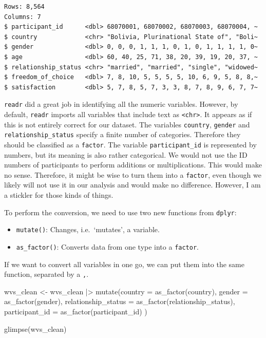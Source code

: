 \documentclass[
  letterpaper,
]{krantz}
\makeatletter
\newenvironment{Shaded}{\begin{snugshade}}{\end{snugshade}}
\newcommand{\AttributeTok}[1]{\textcolor[rgb]{0.40,0.45,0.13}{#1}}
\newcommand{\FunctionTok}[1]{\textcolor[rgb]{0.28,0.35,0.67}{#1}}
\newcommand{\NormalTok}[1]{\textcolor[rgb]{0.00,0.23,0.31}{#1}}
\newcommand{\OtherTok}[1]{\textcolor[rgb]{0.00,0.23,0.31}{#1}}
\newcommand{\SpecialCharTok}[1]{\textcolor[rgb]{0.37,0.37,0.37}{#1}}
\newenvironment{kframe}{%
\medskip{}
\setlength{\fboxsep}{.8em}
 \def\at@end@of@kframe{}%
 \ifinner\ifhmode%
  \def\at@end@of@kframe{\end{minipage}}%
  \begin{minipage}{\columnwidth}%
 \fi\fi%
 \def\FrameCommand##1{\hskip\@totalleftmargin \hskip-\fboxsep
 \colorbox{shadecolor}{##1}\hskip-\fboxsep
     \hskip-\linewidth \hskip-\@totalleftmargin \hskip\columnwidth}%
 \MakeFramed {\advance\hsize-\width
   \@totalleftmargin\z@ \linewidth\hsize
   \@setminipage}}%
 {\par\unskip\endMakeFramed%
 \at@end@of@kframe}
\renewenvironment{Shaded}{\begin{kframe}}{\end{kframe}}
\makeatother
\begin{document}
\begin{verbatim}
Rows: 8,564
Columns: 7
$ participant_id      <dbl> 68070001, 68070002, 68070003, 68070004, ~
$ country             <chr> "Bolivia, Plurinational State of", "Boli~
$ gender              <dbl> 0, 0, 0, 1, 1, 1, 0, 1, 0, 1, 1, 1, 1, 0~
$ age                 <dbl> 60, 40, 25, 71, 38, 20, 39, 19, 20, 37, ~
$ relationship_status <chr> "married", "married", "single", "widowed~
$ freedom_of_choice   <dbl> 7, 8, 10, 5, 5, 5, 5, 10, 6, 9, 5, 8, 8,~
$ satisfaction        <dbl> 5, 7, 8, 5, 7, 3, 3, 8, 7, 8, 9, 6, 7, 7~
\end{verbatim}

\texttt{readr} did a great job in identifying all the numeric variables.
However, by default, \texttt{readr} imports all variables that include
text as \texttt{\textless{}chr\textgreater{}}. It appears as if this is
not entirely correct for our dataset. The variables \texttt{country},
\texttt{gender} and \texttt{relationship\_status} specify a finite
number of categories. Therefore they should be classified as a
\texttt{factor}. The variable \texttt{participant\_id} is represented by
numbers, but its meaning is also rather categorical. We would not use
the ID numbers of participants to perform additions or multiplications.
This would make no sense. Therefore, it might be wise to turn them into
a \texttt{factor}, even though we likely will not use it in our analysis
and would make no difference. However, I am a stickler for those kinds
of things.

To perform the conversion, we need to use two new functions from
\texttt{dplyr}:

\begin{itemize}
\item
  \texttt{mutate()}: Changes, i.e.~`mutates', a variable.
\item
  \texttt{as\_factor()}: Converts data from one type into a
  \texttt{factor}.
\end{itemize}

If we want to convert all variables in one go, we can put them into the
same function, separated by a \texttt{,}.

\begin{Shaded}
\begin{Highlighting}[]
\NormalTok{wvs\_clean }\OtherTok{\textless{}{-}}
\NormalTok{  wvs\_clean }\SpecialCharTok{|\textgreater{}}
  \FunctionTok{mutate}\NormalTok{(}\AttributeTok{country =} \FunctionTok{as\_factor}\NormalTok{(country),}
         \AttributeTok{gender =} \FunctionTok{as\_factor}\NormalTok{(gender),}
         \AttributeTok{relationship\_status =} \FunctionTok{as\_factor}\NormalTok{(relationship\_status),}
         \AttributeTok{participant\_id =} \FunctionTok{as\_factor}\NormalTok{(participant\_id)}
\NormalTok{         )}

\FunctionTok{glimpse}\NormalTok{(wvs\_clean)}
\end{Highlighting}
\end{Shaded}
\end{document}
